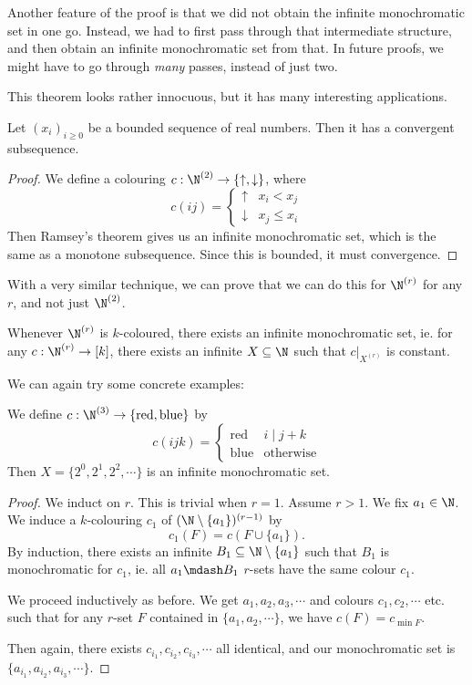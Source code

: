 \documentclass[a4paper]{article}
\begin{document}
Another feature of the proof is that we did not obtain the infinite monochromatic set in one go. Instead, we had to first pass through that intermediate structure, and then obtain an infinite monochromatic set from that. In future proofs, we might have to go through \emph{many} passes, instead of just two.

This theorem looks rather innocuous, but it has many interesting applications.
\begin{cor}
  Let $(x_i)_{i \geq 0}$ be a bounded sequence of real numbers. Then it has a convergent subsequence.
\end{cor}

\begin{proof}
  We define a colouring $c: \N^{(2)} \to \{\uparrow, \downarrow\}$, where
  \[
    c(ij) =
    \begin{cases}
      \uparrow & x_i < x_j\\
      \downarrow & x_j \leq x_i
    \end{cases}
  \]
  Then Ramsey's theorem gives us an infinite monochromatic set, which is the same as a monotone subsequence. Since this is bounded, it must convergence.
\end{proof}

With a very similar technique, we can prove that we can do this for $\N^{(r)}$ for any $r$, and not just $\N^{(2)}$.
\begin{thm}
  Whenever $\N^{(r)}$ is $k$-coloured, there exists an infinite monochromatic set, ie. for any $c: \N^{(r)} \to [k]$, there exists an infinite $X \subseteq \N$ such that $c|_{X^{(r)}}$ is constant.
\end{thm}

We can again try some concrete examples:
\begin{eg}
  We define $c: \N^{(3)} \to \{\mathrm{red}, \mathrm{blue}\}$ by
  \[
    c(ijk) =
    \begin{cases}
      \mathrm{red} & i \mid j + k\\
      \mathrm{blue} & \mathrm{otherwise}
    \end{cases}
  \]
  Then $X = \{2^0, 2^1, 2^2, \cdots\}$ is an infinite monochromatic set.
\end{eg}

\begin{proof}
  We induct on $r$. This is trivial when $r = 1$. Assume $r > 1$. We fix $a_1 \in \N$. We induce a $k$-colouring $c_1$ of $(\N \setminus \{a_1\})^{(r - 1)}$ by
  \[
    c_1(F) = c(F \cup \{a_1\}).
  \]
  By induction, there exists an infinite $B_1 \subseteq \N \setminus \{a_1\}$ such that $B_1$ is monochromatic for $c_1$, ie. all $a_1\mdash B_1$ $r$-sets have the same colour $c_1$.

  We proceed inductively as before. We get $a_1, a_2, a_3, \cdots$ and colours $c_1, c_2, \cdots$ etc. such that for any $r$-set $F$ contained in $\{a_1, a_2, \cdots\}$, we have $c(F) = c_{\min F}$.

  Then again, there exists $c_{i_1}, c_{i_2}, c_{i_3}, \cdots$ all identical, and our monochromatic set is $\{a_{i_1}, a_{i_2}, a_{i_3}, \cdots\}$.
\end{proof}
\end{document}
